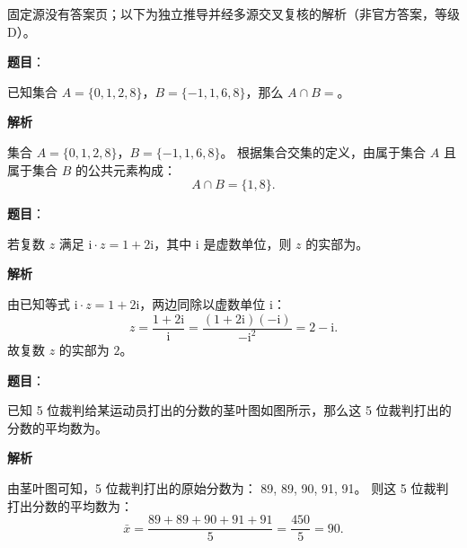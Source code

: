 
\begin{gktip}
固定源没有答案页；以下为独立推导并经多源交叉复核的解析（非官方答案，等级 D）。
\end{gktip}


\begin{answer}

\textbf{题目}：

已知集合 $A = \{0, 1, 2, 8\}$，$B = \{-1, 1, 6, 8\}$，那么 $A \cap B =$\gkblank{}。

\textbf{解析}

集合 $A = \{0, 1, 2, 8\}$，$B = \{-1, 1, 6, 8\}$。
根据集合交集的定义，由属于集合 $A$ 且属于集合 $B$ 的公共元素构成：
\nopagebreak[4]
\[A \cap B = \{1, 8\}.\]


\end{answer}
\begin{answer}

\textbf{题目}：

若复数 $z$ 满足 $\mathrm{i} \cdot z = 1 + 2\mathrm{i}$，其中 $\mathrm{i}$ 是虚数单位，则 $z$ 的实部为\gkblank{}。

\textbf{解析}

由已知等式 $\mathrm{i} \cdot z = 1 + 2\mathrm{i}$，两边同除以虚数单位 $\mathrm{i}$：
\nopagebreak[4]
\[z = \frac{1 + 2\mathrm{i}}{\mathrm{i}} = \frac{(1 + 2\mathrm{i})(-\mathrm{i})}{-\mathrm{i}^2} = 2 - \mathrm{i}.\]
故复数 $z$ 的实部为 $2$。


\end{answer}
\begin{answer}

\textbf{题目}：

已知 5 位裁判给某运动员打出的分数的茎叶图如图所示，那么这 5 位裁判打出的分数的平均数为\gkblank{}。
\nopagebreak[4]
\begin{center}\end{center}
\nopagebreak[4]
\textbf{解析}

由茎叶图可知，5 位裁判打出的原始分数为：
89, 89, 90, 91, 91。
则这 5 位裁判打出分数的平均数为：
\nopagebreak[4]
\[\bar{x} = \frac{89 + 89 + 90 + 91 + 91}{5} = \frac{450}{5} = 90.\]


\end{answer}
